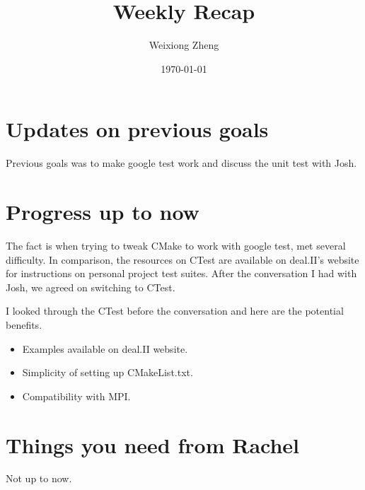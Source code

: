 \documentclass{article}
\title{Weekly Recap} %
\author{Weixiong Zheng} %
\date{\today} %
\begin{document}
\maketitle %

\section{Updates on previous goals}
Previous goals was to make google test work and discuss the unit test with Josh.

\section{Progress up to now}
The fact is when trying to tweak CMake to work with google test, met several difficulty. 
In comparison, the resources on CTest are available on deal.II's website for instructions 
on personal project test suites. After the conversation I had with Josh, we agreed on 
switching to CTest.

I looked through the CTest before the conversation and here are the potential benefits.
\begin{itemize}
	\item Examples available on deal.II website.
	\item Simplicity of setting up CMakeList.txt.
	\item Compatibility with MPI.
\end{itemize}

\section{Things you need from Rachel}
Not up to now.

\end{document}
